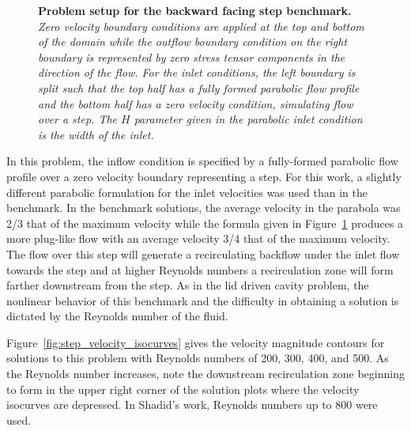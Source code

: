 \begin{figure}[t!]
  \begin{center}
    \scalebox{1.2}{
       }
  \end{center}
  \caption{\textbf{Problem setup for the backward facing step
      benchmark.} \textit{Zero velocity boundary conditions are
      applied at the top and bottom of the domain while the outflow
      boundary condition on the right boundary is represented by zero
      stress tensor components in the direction of the flow. For the
      inlet conditions, the left boundary is split such that the top
      half has a fully formed parabolic flow profile and the bottom
      half has a zero velocity condition, simulating flow over a
      step. The $H$ parameter given in the parabolic inlet condition
      is the width of the inlet.}}
  \label{fig:backward_facing_step}
\end{figure}

In this problem, the inflow condition is specified by a fully-formed
parabolic flow profile over a zero velocity boundary representing a
step. For this work, a slightly different parabolic formulation for
the inlet velocities was used than in the benchmark. In the benchmark
solutions, the average velocity in the parabola was 2/3 that of the
maximum velocity while the formula given in
Figure~\ref{fig:backward_facing_step} produces a more plug-like flow
with an average velocity 3/4 that of the maximum velocity. The flow
over this step will generate a recirculating backflow under the inlet
flow towards the step and at higher Reynolds numbers a recirculation
zone will form farther downstream from the step. As in the lid driven
cavity problem, the nonlinear behavior of this benchmark and the
difficulty in obtaining a solution is dictated by the Reynolds number
of the fluid.

Figure~\ref{fig:step_velocity_isocurves} gives the velocity magnitude
contours for solutions to this problem with Reynolds numbers of 200,
300, 400, and 500. As the Reynolds number increases, note the
downstream recirculation zone beginning to form in the upper right
corner of the solution plots where the velocity isocurves are
depressed. In Shadid's work, Reynolds numbers up to 800 were used.


